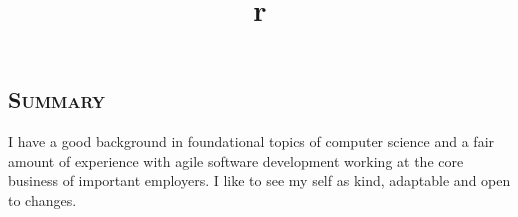 \hypersetup{backref,pdfpagemode=Full,colorlinks=true,backref}
\addtolength{\oddsidemargin}{-0.43in}
\addtolength{\voffset}{-0.30in}
\addtolength{\textwidth}{1.00in} \addtolength{\textheight}{1.50in}
\renewcommand{\namefont}{\LARGE\emph}
\def\Cplusplus{{\rm C\raise.5ex\hbox{\small ++}}}
\def\CSharp{{\rm C\raise.5ex\hbox{\small \#}}}
\def\first{{\raise.5ex\hbox{\small st}}}
\def\second{{\raise.5ex\hbox{\small nd}}}
\def\third{{\raise.5ex\hbox{\small rd}}}
\def\fourth{{\raise.5ex\hbox{\small th}}}

    \address{federicoviscomi@gmail.com \ \ \ \ \ +447801273266 \ \ \ \ \ \ Updated \today}
    \begin{resume}
        \section{\textsc{Summary}}
        I have a good background in foundational topics of computer science
        and a fair amount of experience with agile software development working at the core business of important employers.
        I like to see my self as kind, adaptable and open to changes.

        \begin{formatb}
            \title{r}\\
            \\
            \body\\
        \end{formatb}



\end{resume}
